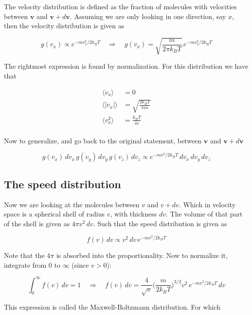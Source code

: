 \documentclass[a4paper]{article}
\begin{document}
The velocity distribution is defined as the fraction of molecules with velocities between $\bm{v}$ and $\bm{v}+d\bm{v}$. Assuming we are only looking in one direction, say $x$, then the velocity distribution is given as

\begin{equation}
	g(v_x)\propto e^{-mv_x^2/2k_BT}\quad\Rightarrow\quad g(v_x)=\sqrt{\frac{m}{2\pi k_BT}}\,e^{-mv_x^2/2k_BT}
\end{equation}

The rightmost expression is found by normalization. For this distribution we have that

\begin{align}
	\langle v_x\rangle&=0\\[.5em]
	\langle |v_x|\rangle&=\sqrt{\frac{2k_BT}{\pi m}}\\[.5em]
	\langle v_x^2\rangle&=\frac{k_BT}{m}\\
\end{align}

Now to generalize, and go back to the original statement, between $\bm{v}$ and $\bm{v}+d\bm{v}$

\begin{equation}
	g(v_x)\,dv_x\,g(v_y)\,dv_y\,g(v_z)\,dv_z\propto e^{-mv^2/2k_BT}\,dv_x\,dv_y\,dv_z
\end{equation}

\subsection{The speed distribution}

Now we are looking at the molecules between $v$ and $v+dv$. Which in velocity space is a spherical shell of radius $v$, with thickness $dv$. The volume of that part of the shell is given as $4\pi v^2\,dv$. Such that the speed distribution is given as

\begin{equation}
	f(v)\,dv\propto v^2\,dv\,e^{-mv^2/2k_BT}
\end{equation}

Note that the $4\pi$ is absorbed into the proportionality. Now to normalize it, integrate from $0$ to $\infty$ (since $v>0$):

\begin{equation}
	\int_0^\infty f(v)\,dv=1\quad\Rightarrow\quad f(v)\,dv=\frac{4}{\sqrt{\pi}}\bigg(\frac{m}{2k_BT}\bigg)^{3/2}v^2\,e^{-mv^2/2k_BT}\,dv
\end{equation}

This expression is called the Maxwell-Boltzmann distribution. For which
\end{document}
